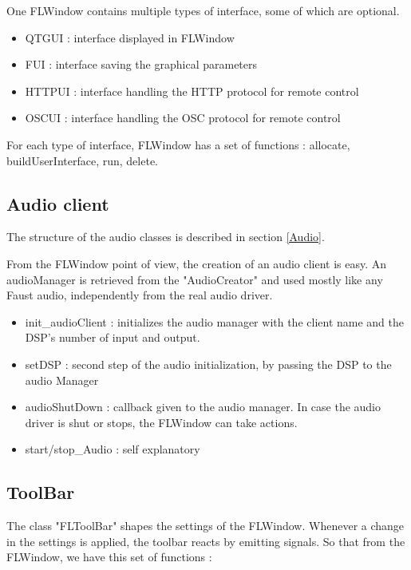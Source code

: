\documentclass[a4paper]{article}
\begin{document}
One FLWindow contains multiple types of interface, some of which are optional. 

\begin{itemize}
\item QTGUI : interface displayed in FLWindow
\item FUI : interface saving the graphical parameters
\item HTTPUI : interface handling the HTTP protocol for remote control
\item OSCUI : interface handling the OSC protocol for remote control 
\end{itemize}

For each type of interface, FLWindow has a set of functions : allocate, buildUserInterface, run, delete.

\subsection{Audio client}

The structure of the audio classes is described in section \ref{Audio}.

From the FLWindow point of view, the creation of an audio client is easy. An audioManager is retrieved from the "AudioCreator" and used mostly like any Faust audio, independently from the real audio driver. 

\begin{itemize}
\item init\_audioClient : initializes the audio manager with the client name and the DSP's number of input and output.
\item setDSP : second step of the audio initialization, by passing the DSP to the audio Manager
\item audioShutDown : callback given to the audio manager. In case the audio driver is shut or stops, the FLWindow can take actions. 
\item start/stop\_Audio : self explanatory

\end{itemize}
\subsection{ToolBar}

The class "FLToolBar" shapes the settings of the FLWindow. Whenever a change in the settings is applied, the toolbar reacts by emitting signals. So that from the FLWindow, we have this set of functions :
\end{document}
